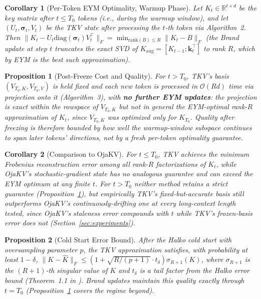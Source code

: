 \documentclass{article}
\newtheorem{proposition}{Proposition}
\newtheorem{corollary}{Corollary}
\newcommand{\R}{\mathbb{R}}
\begin{document}
\begin{corollary}[Per-Token EYM Optimality, Warmup Phase]
\label{cor:eym}
Let $K_t \in \R^{t \times d}$ be the key matrix after $t \leq T_0$ tokens
(i.e., during the warmup window), and let
$(U_t, \boldsymbol{\sigma}_t, V_t)$ be the TKV state after processing the $t$-th
token via Algorithm~2.  Then
$\| K_t - U_t \mathrm{diag}(\boldsymbol{\sigma}_t) V_t^\top \|_F
  = \min_{\mathrm{rank}(B) \leq R} \| K_t - B \|_F$
(the Brand update at step $t$ truncates the exact SVD of
$K_{\mathrm{aug}} = [K_{t-1}; \mathbf{k}_t^\top]$ to rank $R$, which by EYM
is the best such approximation).
\end{corollary}

\begin{proposition}[Post-Freeze Cost and Quality]
\label{prop:postfreeze}
For $t > T_0$, TKV's basis $(V_{T_0,K}, V_{T_0,V})$ is held fixed and each
new token is processed in $\mathcal{O}(Rd)$ time via projection onto it
(Algorithm~3), with \textbf{no further EYM updates}: the projection is exact
within the rowspace of $V_{T_0,K}$ but not in general the EYM-optimal
rank-$R$ approximation of $K_t$, since $V_{T_0,K}$ was optimized only for
$K_{T_0}$.  Quality after freezing is therefore bounded by how well the
warmup-window subspace continues to span later tokens' directions, not by a
fresh per-token optimality guarantee.
\end{proposition}

\begin{corollary}[Comparison to OjaKV]
For $t \leq T_0$, TKV achieves the minimum Frobenius reconstruction error
among all rank-$R$ factorizations of $K_t$, while OjaKV's stochastic-gradient
state has no analogous guarantee and can exceed the EYM optimum at any
finite $t$.  For $t > T_0$ neither method retains a strict guarantee
(Proposition~\ref{prop:postfreeze}), but empirically TKV's
fixed-but-accurate basis still outperforms OjaKV's continuously-drifting
one at every long-context length tested, since OjaKV's staleness error
compounds with $t$ while TKV's frozen-basis error does not
(Section~\ref{sec:experiments}).
\end{corollary}

\begin{proposition}[Cold Start Error Bound]
After the Halko cold start with oversampling parameter $p$, the TKV
approximation satisfies, with probability at least $1 - \delta$,
$\| K - \hat{K} \|_F \leq
  \left(1 + \sqrt{R/(p+1)} \cdot t_\delta \right) \sigma_{R+1}(K)$,
where $\sigma_{R+1}$ is the $(R+1)$-th singular value of $K$ and $t_\delta$ is
a tail factor from the Halko error bound (Theorem~1.1 in \citep{halko2011}).
Brand updates maintain this quality exactly through $t = T_0$
(Proposition~\ref{prop:postfreeze} covers the regime beyond).
\end{proposition}
\end{document}
